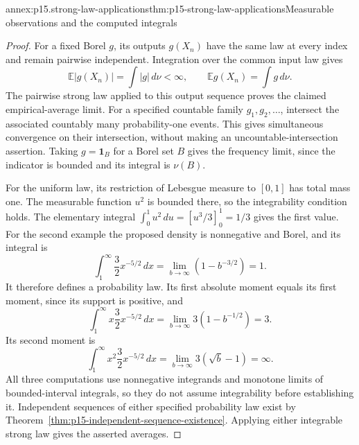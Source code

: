 \begin{annexitem}{annex:p15.strong-law-applications}{thm:p15-strong-law-applications}{Measurable observations and the computed integrals}
\begin{proof}
For a fixed Borel \(g\), its outputs \(g(X_n)\) have the same
law at every index and remain pairwise independent. Integration over
the common input law gives
\[
 \mathbb E|g(X_n)|=\int|g|\,d\nu<\infty,
 \qquad \mathbb Eg(X_n)=\int g\,d\nu.
\]
The pairwise strong law applied to this output sequence proves the
claimed empirical-average limit. For a specified countable family
\(g_1,g_2,\ldots\), intersect the associated countably many
probability-one events. This gives simultaneous convergence on their
intersection, without making an uncountable-intersection assertion.
Taking \(g=\mathbf1_B\) for a Borel set \(B\) gives the frequency
limit, since the indicator is bounded and its integral is \(\nu(B)\).

For the uniform law, its restriction of Lebesgue measure to \([0,1]\)
has total mass one. The measurable function \(u^2\) is bounded
there, so the integrability condition holds. The elementary integral
\(\int_0^1u^2\,du=[u^3/3]_0^1=1/3\) gives the first value.
For the second example the proposed density is nonnegative and Borel,
and its integral is
\[
 \int_1^\infty\frac32x^{-5/2}\,dx
      =\lim_{b\to\infty}(1-b^{-3/2})=1.
\]
It therefore defines a probability law. Its first absolute moment
equals its first moment, since its support is positive, and
\[
 \int_1^\infty x\frac32x^{-5/2}\,dx
      =\lim_{b\to\infty}3(1-b^{-1/2})=3.
\]
Its second moment is
\[
 \int_1^\infty x^2\frac32x^{-5/2}\,dx
      =\lim_{b\to\infty}3(\sqrt b-1)=\infty.
\]
All three computations use nonnegative integrands and monotone
limits of bounded-interval integrals, so they do not assume integrability
before establishing it. Independent sequences of either specified
probability law exist by
Theorem~\ref{thm:p15-independent-sequence-existence}. Applying
either integrable strong law gives the asserted averages.
\end{proof}
\end{annexitem}

